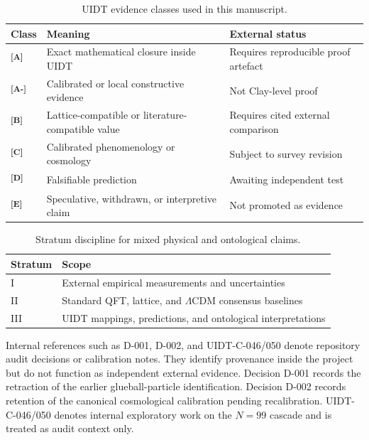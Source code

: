 \documentclass[12pt,a4paper,twoside]{article}
\theoremstyle{plain}
\theoremstyle{definition}
\theoremstyle{remark}
\newcommand{\catmark}[1]{\textsuperscript{\textsf{\textbf{[#1]}}}}
\begin{document}
\begin{table}[H]
\centering
\caption{UIDT evidence classes used in this manuscript.}
\label{tab:evidence_classes}
\small
\setlength{\tabcolsep}{4pt}%
\renewcommand{\arraystretch}{1.18}%
\begin{tabular}{@{}>{\centering\arraybackslash}p{1.8cm}
                >{\raggedright\arraybackslash}p{6.0cm}
                >{\raggedright\arraybackslash}p{4.7cm}@{}}
\toprule
\textbf{Class} & \textbf{Meaning} & \textbf{External status} \\
\midrule
\catmark{A} & Exact mathematical closure inside UIDT & Requires reproducible proof artefact \\
\midrule
\catmark{A-} & Calibrated or local constructive evidence & Not Clay-level proof \\
\midrule
\catmark{B} & Lattice-compatible or literature-compatible value & Requires cited external comparison \\
\midrule
\catmark{C} & Calibrated phenomenology or cosmology & Subject to survey revision \\
\midrule
\catmark{D} & Falsifiable prediction & Awaiting independent test \\
\midrule
\catmark{E} & Speculative, withdrawn, or interpretive claim & Not promoted as evidence \\
\bottomrule
\end{tabular}
\end{table}
\vspace{-0.5em}
\begin{table}[H]
\centering
\caption{Stratum discipline for mixed physical and ontological claims.}
\label{tab:strata}
\begin{tabular}{ll}
\toprule
\textbf{Stratum} & \textbf{Scope} \\
\midrule
I & External empirical measurements and uncertainties \\
II & Standard QFT, lattice, and $\Lambda\mathrm{CDM}$ consensus baselines \\
III & UIDT mappings, predictions, and ontological interpretations \\
\bottomrule
\end{tabular}
\end{table}
\vspace{-0.5em}
Internal references such as D-001, D-002, and UIDT-C-046/050 denote repository
audit decisions or calibration notes. They identify provenance inside the
project but do not function as independent external evidence. Decision D-001
records the retraction of the earlier glueball-particle identification.
Decision D-002 records retention of the canonical cosmological calibration
pending recalibration. UIDT-C-046/050 denotes internal exploratory
work on the $N=99$ cascade and is treated as audit context only.
\end{document}

